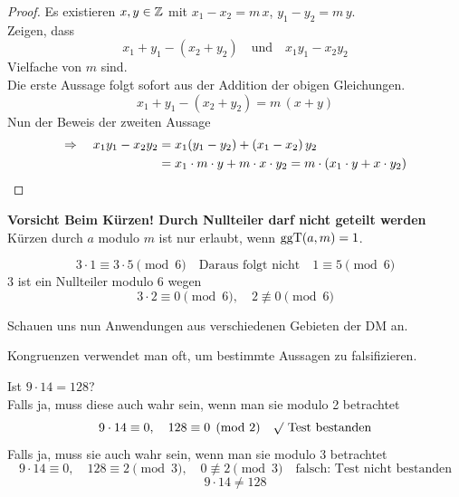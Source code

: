 \begin{proof}
Es existieren $x, y \in \mathbb{Z}$ mit $x_1 - x_2 = m\,x$, $y_1 - y_2 = m\,y$.\\
Zeigen, dass
\[ x_1 + y_1 - (x_2 + y_2) \quad\text{und}\quad x_1 y_1 - x_2 y_2 \]
Vielfache von $m$ sind.\\
Die erste Aussage folgt sofort aus der Addition der obigen Gleichungen.
\[ x_1 + y_1 - (x_2 + y_2) = m\,(x + y) \]
Nun der Beweis der zweiten Aussage
\begin{align*}
\Rightarrow \quad x_1 y_1 - x_2 y_2 &= x_1 (y_1 - y_2) + (x_1 - x_2)\, y_2 \\
&= x_1 \cdot m \cdot y + m \cdot x \cdot y_2 = m \cdot (x_1 \cdot y + x \cdot y_2) \qedhere
\end{align*}
\end{proof}

\begin{bemerkung}
\textbf{Vorsicht Beim Kürzen! Durch Nullteiler darf nicht geteilt werden}\\
Kürzen durch $a$ modulo $m$ ist nur erlaubt, wenn $\operatorname{ggT}(a, m) = 1$.
\end{bemerkung}

\begin{beispiel}
\[ 3 \cdot 1 \equiv 3 \cdot 5 \pmod{6} \quad \text{Daraus folgt nicht} \quad 1 \equiv 5 \pmod{6} \]
$3$ ist ein Nullteiler modulo $6$ wegen
\[ 3 \cdot 2 \equiv 0 \pmod{6}, \quad 2 \not\equiv 0 \pmod{6} \]
\end{beispiel}

Schauen uns nun Anwendungen aus verschiedenen Gebieten der DM an.

Kongruenzen verwendet man oft, um bestimmte Aussagen zu falsifizieren.

\begin{beispiel}
Ist $9 \cdot 14 = 128$?\\
Falls ja, muss diese auch wahr sein, wenn man sie modulo 2 betrachtet
\[ 9 \cdot 14 \equiv 0, \quad 128 \equiv 0 \pmod{2} \quad \surd \text{ Test bestanden} \]
Falls ja, muss sie auch wahr sein, wenn man sie modulo 3 betrachtet
\[ 9 \cdot 14 \equiv 0, \quad 128 \equiv 2 \pmod{3}, \quad 0 \not\equiv 2 \pmod{3} \quad \text{falsch: Test nicht bestanden} \]
\[ 9 \cdot 14 \neq 128 \]
\end{beispiel}

